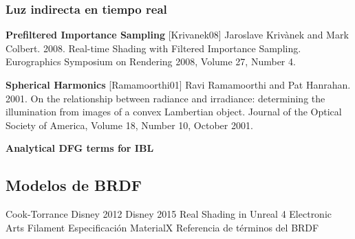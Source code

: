         \subsubsection*{Luz indirecta en tiempo real}

            \textbf{Prefiltered Importance Sampling}
            [Krivanek08] Jaroslave Krivànek and Mark Colbert. 2008. Real-time Shading with Filtered Importance Sampling. Eurographics Symposium on Rendering 2008, Volume 27, Number 4.

            \textbf{Spherical Harmonics}
            [Ramamoorthi01] Ravi Ramamoorthi and Pat Hanrahan. 2001. On the relationship between radiance and irradiance: determining the illumination from images of a convex Lambertian object. Journal of the Optical Society of America, Volume 18, Number 10, October 2001.

            \textbf{Analytical DFG terms for IBL}

    \subsection{Modelos de BRDF}
    Cook-Torrance \autocite{cooktorrance}
    Disney 2012 \autocite{disney12}
    Disney 2015 \autocite{disney15}
    Real Shading in Unreal 4 \autocite{karis}
    Electronic Arts \autocite{frostbite}
    Filament \autocite{filament}
    Especificaci\'on MaterialX \autocite{materialx}
    Referencia de t\'erminos del BRDF \autocite{brdfreference}
